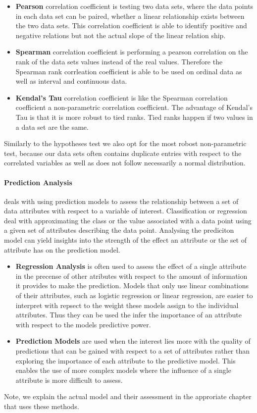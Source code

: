 \begin{itemize}
\item\textbf{Pearson} correlation coefficient is testing two data sets, where the data points in each data set can be paired, whether a linear relationship exists between the two data sets.
This correlation coefficient is able to identify positive and negative relations but not the actual slope of the linear relation ship.

\item\textbf{Spearman} correlation coefficient is performing a pearson correlation on the rank of the data sets values instead of the real values.
Therefore the Spearman rank corrleation coefficient is able to be used on ordinal data as well as interval and continuous data. 

\item\textbf{Kendal's Tau} correlation coefficient is like the Spearman correlation coefficient a non-parametric correlation coefficient.
The advantage of Kendal's Tau is that it is more robust to tied ranks.
Tied ranks happen if two values in a data set are the same.
\end{itemize}

Similarly to the hypotheses test we also opt for the most robost non-parametric test, because our data sets often contains duplicate entries with respect to the correlated variables as well as does not follow necessarily a normal distribution.

\paragraph{Prediction Analysis} deals with using prediction models to assess the relationship between a set of data attributes with respect to a variable of interest.
Classification or regression deal with approximating the class or the value associated with a data point using a given set of attributes describing the data point.
Analysing the prediciton model can yield insights into the strength of the effect an attribute or the set of attribute has on the prediction model.
\begin{itemize}
\item\textbf{Regression Analysis} is often used to assess the effect of a single attribute in the precense of other atributes with respect to the amount of information it provides to make the prediction.
Models that only use linear combinations of their attributes, such as logistic regression or linear regression, are easier to interpret with repsect to the weight these models assign to the individual attributes.
Thus they can be used the infer the importance of an attribute with respect to the models predictive power.
\item\textbf{Prediction Models} are used when the interest lies more with the quality of predictions that can be gained with respect to a set of attributes rather than exploring the importance of each attribute to the predictive model.
This enables the use of more complex models where the influence of a single attribute is more difficult to assess.
\end{itemize}
Note, we explain the actual model and their assessment in the approriate chapter that uses these methods.


